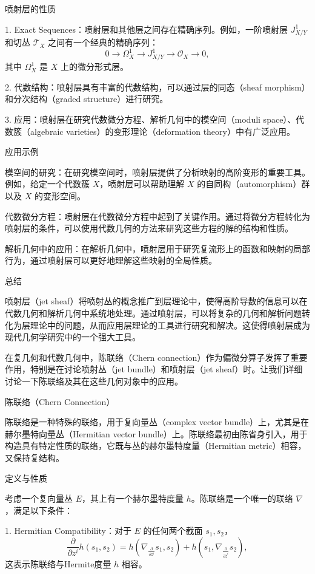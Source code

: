 \documentclass[lang=cn,12pt,fontset=none,a4paper]{beautybook}
\begin{document}
喷射层的性质

1. Exact Sequences：喷射层和其他层之间存在精确序列。例如，一阶喷射层 $J^1_{X/Y}$ 和切丛 $\mathcal{T}_X$ 之间有一个经典的精确序列：
$$ 0 \to \Omega^1_X \to J^1_{X/Y} \to \mathcal{O}_X \to 0, $$
其中 $\Omega^1_X$ 是 $X$ 上的微分形式层。

2. 代数结构：喷射层具有丰富的代数结构，可以通过层的同态（sheaf morphism）和分次结构（graded structure）进行研究。

3. 应用：喷射层在研究代数微分方程、解析几何中的模空间（moduli space）、代数簇（algebraic varieties）的变形理论（deformation theory）中有广泛应用。

应用示例

模空间的研究：在研究模空间时，喷射层提供了分析映射的高阶变形的重要工具。例如，给定一个代数簇 $X$，喷射层可以帮助理解 $X$ 的自同构（automorphism）群以及 $X$ 的变形空间。

代数微分方程：喷射层在代数微分方程中起到了关键作用。通过将微分方程转化为喷射层的条件，可以使用代数几何的方法来研究这些方程的解的结构和性质。

解析几何中的应用：在解析几何中，喷射层用于研究复流形上的函数和映射的局部行为，通过喷射层可以更好地理解这些映射的全局性质。

总结

喷射层（jet sheaf）将喷射丛的概念推广到层理论中，使得高阶导数的信息可以在代数几何和解析几何中系统地处理。通过喷射层，可以将复杂的几何和解析问题转化为层理论中的问题，从而应用层理论的工具进行研究和解决。这使得喷射层成为现代几何学研究中的一个强大工具。

在复几何和代数几何中，陈联络（Chern connection）作为偏微分算子发挥了重要作用，特别是在讨论喷射丛（jet bundle）和喷射层（jet sheaf）时。让我们详细讨论一下陈联络及其在这些几何对象中的应用。

陈联络（Chern Connection）

陈联络是一种特殊的联络，用于复向量丛（complex vector bundle）上，尤其是在赫尔墨特向量丛（Hermitian vector bundle）上。陈联络最初由陈省身引入，用于构造具有特定性质的联络，它既与丛的赫尔墨特度量（Hermitian metric）相容，又保持复结构。

定义与性质

考虑一个复向量丛 $E$，其上有一个赫尔墨特度量 $h$。陈联络是一个唯一的联络 $\nabla$，满足以下条件：

1. Hermitian Compatibility：对于 $E$ 的任何两个截面 $s_1, s_2$，
$$
   \frac{\partial}{\partial z^i} h(s_1, s_2) = h(\nabla_{\frac{\partial}{\partial z^i}} s_1, s_2) + h(s_1, \nabla_{\frac{\partial}{\partial \overline{z}^i}} s_2),
$$
这表示陈联络与Hermite度量 $h$ 相容。
\end{document}
